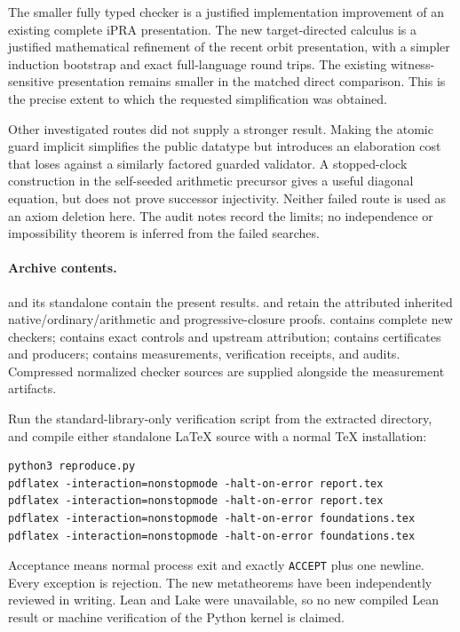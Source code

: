 \documentclass[11pt,a4paper]{article}
\theoremstyle{definition}\newtheorem{definition}[theorem]{Definition}
\begin{document}
The smaller fully typed checker is a justified implementation improvement
of an existing complete iPRA presentation. The new target-directed
calculus is a justified mathematical refinement of the recent orbit
presentation, with a simpler induction bootstrap and exact full-language
round trips. The existing witness-sensitive presentation remains smaller
in the matched direct comparison. This is the precise extent to which the
requested simplification was obtained.

Other investigated routes did not supply a stronger result. Making the
atomic guard implicit simplifies the public datatype but introduces an
elaboration cost that loses against a similarly factored guarded
validator. A stopped-clock construction in the self-seeded arithmetic
precursor gives a useful diagonal equation, but does not prove successor
injectivity. Neither failed route is used as an axiom deletion here.
The audit notes record the limits; no independence or impossibility
theorem is inferred from the failed searches.

\paragraph{Archive contents.}
 and its standalone  contain the present
results.  and  retain the
attributed inherited native/ordinary/arithmetic and progressive-closure
proofs.  contains complete new checkers; 
contains exact controls and upstream attribution;  contains
certificates and producers;  contains measurements,
verification receipts, and audits. Compressed normalized checker sources
are supplied alongside the measurement artifacts.

Run the standard-library-only verification script from the extracted
directory, and compile either standalone LaTeX source with a normal
TeX installation:
\begin{lstlisting}
python3 reproduce.py
pdflatex -interaction=nonstopmode -halt-on-error report.tex
pdflatex -interaction=nonstopmode -halt-on-error report.tex
pdflatex -interaction=nonstopmode -halt-on-error foundations.tex
pdflatex -interaction=nonstopmode -halt-on-error foundations.tex
\end{lstlisting}
Acceptance means normal process exit and exactly \texttt{ACCEPT} plus one
newline. Every exception is rejection. The new metatheorems have been
independently reviewed in writing. Lean and Lake were unavailable, so
no new compiled Lean result or machine verification of the Python
kernel is claimed.
\end{document}
